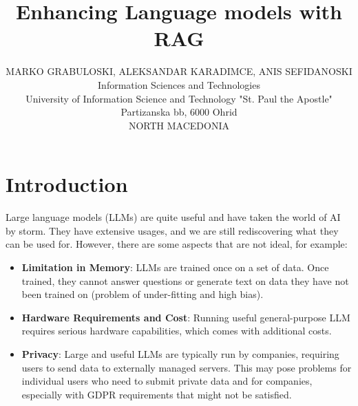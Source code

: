 \documentclass{wseas}
\author{
  MARKO GRABULOSKI, ALEKSANDAR KARADIMCE, ANIS SEFIDANOSKI\\
  Information Sciences and Technologies\\
  University of Information Science and Technology "St. Paul the Apostle"\\
  Partizanska bb, 6000 Ohrid\\
  NORTH MACEDONIA
}
\title{Enhancing Language models with RAG}
\begin{document}

\section{Introduction}

Large language models (LLMs) are quite useful and have taken the world of AI by storm. They have
extensive usages, and we are still rediscovering what they can be used
for. However, there are some aspects that are not ideal, for example:

\begin{itemize}

\item
  \textbf{Limitation in Memory}: LLMs are trained once on a set of data.
  Once trained, they cannot answer questions or generate text on data
  they have not been trained on (problem of under-fitting and high
  bias).
\item
  \textbf{Hardware Requirements and Cost}: Running useful
  general-purpose LLM requires serious hardware capabilities, which
  comes with additional costs.
\item
  \textbf{Privacy}: Large and useful LLMs are typically run by
  companies, requiring users to send data to externally managed servers.
  This may pose problems for individual users who need to submit private
  data and for companies, especially with GDPR requirements that might
  not be satisfied.
\end{itemize}
\end{document}
